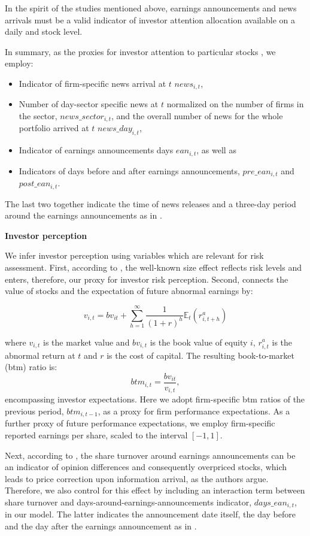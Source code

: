 \documentclass[11pt]{article}
\providecommand{\tightlist}{%
  \setlength{\itemsep}{0pt}\setlength{\parskip}{0pt}}
\begin{document}
In the spirit of the studies mentioned above, earnings announcements and news arrivals must be a valid indicator of investor attention allocation available on a daily and stock level.

In summary, as the proxies for investor attention to particular stocks , we employ:

\begin{itemize}
\tightlist
\item
  Indicator of firm-specific news arrival at \(t\) \(news_{i,t}\),
\item
  Number of day-sector specific news at \(t\) normalized on the number of firms in the sector, \(news\_sector_{i,t}\), and the overall number of news for the whole portfolio arrived at \(t\) \(news\_day_{i,t}\),
\item
  Indicator of earnings announcements days \(ean_{i,t}\), as well as
\item
  Indicators of days before and after earnings announcements, \(pre\_ean_{i,t}\) and \(post\_ean_{i,t}\).
\end{itemize}

The last two together indicate the time of news releases and a three-day period around the earnings announcements as in \cite{BERKMAN2009}.

\newpage
{\bf {Investor perception}}

We infer investor perception using variables which are relevant for risk assessment.
First, according to \cite{FRIEND1988}, the well-known size effect reflects risk levels and enters, therefore, our proxy for investor risk perception.
Second, \cite{Peasnell1982} connects the value of stocks and the expectation of future abnormal earnings by:

\[v_{i,t}= bv_{it} + \sum_{h=1}^\infty \frac1{(1+r)^h}\mathbb E_t(r_{i,t+h}^a)\]

where $v_{i,t}$ is the market value and $bv_{i,t}$ is the book value of  equity $i$, $r_{i,t}^a$ is the abnormal return at $t$ and $r$ is the cost of capital. The resulting book-to-market (btm) ratio is:
\[btm_{i,t} = \frac{bv_{it}}{v_{i,t}},\]
encompassing investor expectations. Here we adopt firm-specific btm ratios of the previous period, $btm_{i,t-1}$, as a proxy for firm performance expectations.  As a further proxy of future performance expectations, we employ firm-specific reported earnings per share, scaled to the interval $[-1,1]$.

Next, according to \cite{BERKMAN2009}, the share turnover around earnings announcements can be an indicator of opinion differences and consequently overpriced stocks, which leads to price correction upon information arrival, as the authors argue. Therefore, we also control for this effect by including an interaction term between share turnover and days-around-earnings-announcements indicator, $days\_ean_{i,t}$, in our model. The latter indicates the announcement date itself, the day before and the day after the earnings announcement as in \cite{BERKMAN2009}.
\end{document}

